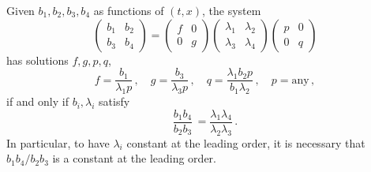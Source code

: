 \documentclass[12pt]{amsart}
\theoremstyle{remark}
\theoremstyle{definition}
\numberwithin{equation}{section}
\begin{document}
Given $b_1, b_2, b_3, b_4$ as functions of $(t,x)$, the system 
\[
\begin{pmatrix} 
b_1 & b_2 \\ 
b_3 & b_4 \end{pmatrix}
=
\begin{pmatrix} 
f & 0 \\ 
0 & g \end{pmatrix}
\begin{pmatrix} 
\lambda_1 & \lambda_2 \\ 
\lambda_3 & \lambda_4 \end{pmatrix}
\begin{pmatrix} 
p & 0 \\ 
0 & q \end{pmatrix}
\]
has solutions $f,g,p,q$, 
\begin{equation} \label{fgqDef}
f = \frac{b_1}{\lambda_1 p}\,, \quad 
g = \frac{b_3}{\lambda_3 p}\,, \quad
q = \frac{\lambda_1 b_2 p}{b_1 \lambda_2}\,, \quad
p = \text{any}\,,   
\end{equation}
if and only if $b_i, \lambda_i$ satisfy
\[
\frac{b_1 b_4}{b_2 b_3} \, = \frac{\lambda_1 \lambda_4}{\lambda_2 \lambda_3}\,.
\]
In particular, to have $\lambda_i$ constant  at the leading order, it is necessary that $b_1 b_4 / b_2 b_3$ is a constant at the leading order.
\end{document}
